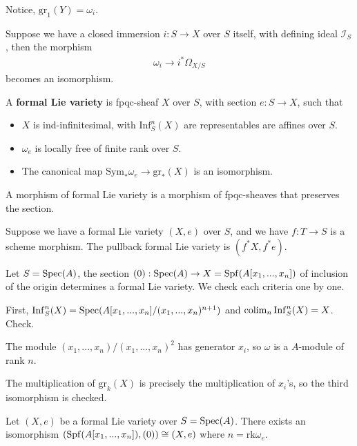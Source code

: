 Notice, $\mathrm{gr}_1(Y)= \omega_i$.

Suppose we have a closed immersion $i: S\to X$ over $S$ itself, with defining ideal $\mathcal{I}_S$, then the morphism 
\begin{align*}
    \omega_i\to i^*\Omega_{X/S}
\end{align*}becomes an isomorphism.

\begin{definition}
    A \textbf{formal Lie variety} is fpqc-sheaf $X$ over $S$, with section $e: S\to X$, such that 
    \begin{itemize}
        \item $X$ is ind-infinitesimal, with $\mathrm{Inf}_S^n(X)$ are representables are affines over $S$.
        \item $\omega_e$ is locally free of finite rank over $S$.
        \item The canonical map $\mathrm{Sym}_*\omega_e\to \mathrm{gr}_*(X)$ is an isomorphism.
    \end{itemize}
    A morphism of formal Lie variety is a morphism of fpqc-sheaves that preserves the section.
\end{definition}

\begin{definition}
    Suppose we have a formal Lie variety $(X,e)$ over $S$, and we have $f:T\to S$ is a scheme morphism. The pullback formal Lie variety is $(f^*X, f^*e)$.
\end{definition}

\begin{remark}
    Let $S=\operatorname{\mathrm{Spec}}(A)$, the section $(0):\operatorname{\mathrm{Spec}}(A)\to X=\operatorname{\mathrm{Spf}}(A[x_1,...,x_n])$ of inclusion of the origin determines a formal Lie variety. We check each criteria one by one.

    First, $\mathrm{Inf}_S^n(X)=\operatorname{\mathrm{Spec}}(A[x_1,...,x_n]/(x_1,...,x_n)^{n+1})$ and $\operatorname{colim}_n \mathrm{Inf}_S^n(X)=X$. Check.

    The module $(x_1,...,x_n)/(x_1,...,x_n)^{2}$ has generator $x_i$, so $\omega$ is a $A$-module of rank $n$.

    The multiplication of $\mathrm{gr}_k(X)$ is precisely the multiplication of $x_i$'s, so the third isomorphism is checked.
\end{remark}
\begin{proposition}
    Let $(X,e)$ be a formal Lie variety over $S=\operatorname{\mathrm{Spec}}(A)$. There exists an isomorphism $(\operatorname{\mathrm{Spf}}(A[x_1,...,x_n]), (0))\cong (X,e)$ where $n=\mathrm{rk}\omega_e$.
\end{proposition}

